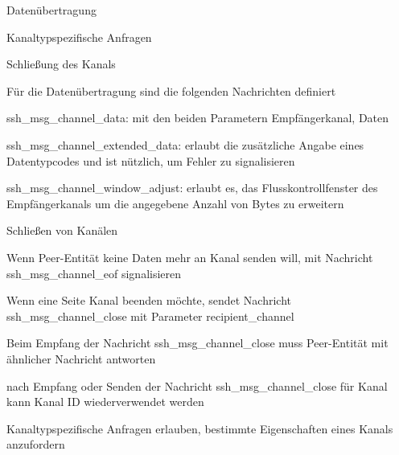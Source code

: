 \documentclass[a4paper]{article}
\begin{document}
\begin{multicols}{3}
\begin{itemize*}
            \begin{itemize*}
                  \item Datenübertragung %
                  \item Kanaltypspezifische Anfragen
                  \item Schließung des Kanals
            \end{itemize*}
            \item Für die Datenübertragung sind die folgenden Nachrichten definiert
            \begin{itemize*}
                  \item ssh\_msg\_channel\_data: mit den beiden Parametern Empfängerkanal, Daten
                  \item ssh\_msg\_channel\_extended\_data: erlaubt die zusätzliche Angabe eines Datentypcodes und ist nützlich, um Fehler zu signalisieren%
                  \item ssh\_msg\_channel\_window\_adjust: erlaubt es, das Flusskontrollfenster des Empfängerkanals um die angegebene Anzahl von Bytes zu erweitern
            \end{itemize*}
            \item Schließen von Kanälen
            \begin{itemize*}
                  \item Wenn Peer-Entität keine Daten mehr an Kanal senden will, mit Nachricht ssh\_msg\_channel\_eof signalisieren
                  \item Wenn eine Seite Kanal beenden möchte, sendet Nachricht ssh\_msg\_channel\_close mit Parameter recipient\_channel
                  \item Beim Empfang der Nachricht ssh\_msg\_channel\_close muss Peer-Entität mit ähnlicher Nachricht antworten%
                  \item nach Empfang oder Senden der Nachricht ssh\_msg\_channel\_close für Kanal kann Kanal ID wiederverwendet werden
            \end{itemize*}
            \item Kanaltypspezifische Anfragen erlauben, bestimmte Eigenschaften eines Kanals anzufordern%

\end{itemize*}
\end{multicols}
\end{document}
